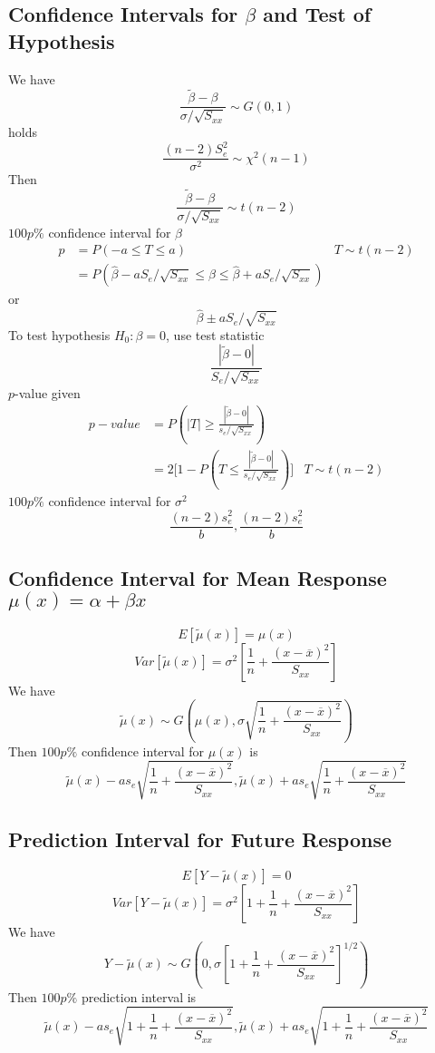 \documentclass[11pt]{article}
\begin{document}
\subsection{Confidence Intervals for $\beta$ and Test of Hypothesis}
We have \[\frac{\tilde{\beta}-\beta}{\sigma/\sqrt{S_{xx}}}\sim G(0,1)\]
holds \[\frac{(n-2)S_e^2}{\sigma^2}\sim\chi^2(n-1)\]
Then \[\frac{\tilde{\beta}-\beta}{\sigma/\sqrt{S_{xx}}}\sim t(n-2)\]
$100p\%$ confidence interval for $\beta$
\begin{align*}
  p &= P(-a\leq T\leq a) &T\sim t(n-2) \\
    &= P(\hat{\beta}-aS_e/\sqrt{S_{xx}}\leq\beta\leq\hat{\beta}+aS_e/\sqrt{S_{xx}})
\end{align*}
or \[\hat{\beta}\pm aS_e/\sqrt{S_{xx}}\]
To test hypothesis $H_0:\beta=0$, use test statistic \[\frac{|\tilde{\beta}-0|}{S_e/\sqrt{S_{xx}}}\]
$p$-value given 
\begin{align*}
  p-value &= P(|T|\geq \frac{|\tilde{\beta}-0|}{s_e/\sqrt{S_{xx}}}) \\
          &= 2\Big[1 - P(T\leq \frac{|\tilde{\beta}-0|}{s_e/\sqrt{S_{xx}}})\Big] &T\sim t(n-2)
\end{align*}
$100p\%$ confidence interval for $\sigma^2$ 
\[\frac{(n-2)s_e^2}{b}, \frac{(n-2)s_e^2}{b}\]
\subsection{Confidence Interval for Mean Response $\mu(x) = \alpha+\beta x$}
\[E[\tilde{\mu}(x)] = \mu(x)\]
\[Var[\tilde{\mu}(x)] = \sigma^2[\frac{1}{n}+\frac{(x-\overline{x})^2}{S_{xx}}]\]
We have \[\tilde{\mu}(x)\sim G(\mu(x), \sigma\sqrt{\frac{1}{n}+\frac{(x-\overline{x})^2}{S_{xx}}})\]
Then $100p\%$ confidence interval for $\mu(x)$ is 
\[\tilde{\mu}(x) - as_e\sqrt{\frac{1}{n}+\frac{(x-\overline{x})^2}{S_{xx}}}, \tilde{\mu}(x) + as_e\sqrt{\frac{1}{n}+\frac{(x-\overline{x})^2}{S_{xx}}}\]
\subsection{Prediction Interval for Future Response}
\[E[Y-\tilde{\mu}(x)] = 0\]
\[Var[Y-\tilde{\mu}(x)] = \sigma^2[1+\frac{1}{n}+\frac{(x-\overline{x})^2}{S_{xx}}]\]
We have \[Y-\tilde{\mu}(x)\sim G(0, \sigma[1+\frac{1}{n}+\frac{(x-\overline{x})^2}{S_{xx}}]^{1/2})\]
Then $100p\%$ prediction interval is 
\[\tilde{\mu}(x)-as_e\sqrt{1+\frac{1}{n}+\frac{(x-\overline{x})^2}{S_{xx}}}, \tilde{\mu}(x)+as_e\sqrt{1+\frac{1}{n}+\frac{(x-\overline{x})^2}{S_{xx}}}\]
\end{document}
